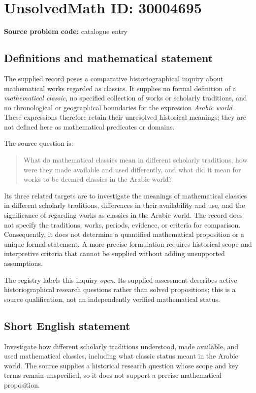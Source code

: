 \documentclass[11pt]{article}
\begin{document}
\section*{UnsolvedMath ID: 30004695}
\textbf{Source problem code:} catalogue entry
\subsection{Definitions and mathematical statement}
The supplied record poses a comparative historiographical inquiry about mathematical works regarded as classics. It supplies no formal definition of a \emph{mathematical classic}, no specified collection of works or scholarly traditions, and no chronological or geographical boundaries for the expression \emph{Arabic world}. These expressions therefore retain their unresolved historical meanings; they are not defined here as mathematical predicates or domains.

The source question is:
\begin{quote}
What do mathematical classics mean in different scholarly traditions, how were they made available and used differently, and what did it mean for works to be deemed classics in the Arabic world?
\end{quote}
Its three related targets are to investigate the meanings of mathematical classics in different scholarly traditions, differences in their availability and use, and the significance of regarding works as classics in the Arabic world. The record does not specify the traditions, works, periods, evidence, or criteria for comparison. Consequently, it does not determine a quantified mathematical proposition or a unique formal statement. A more precise formulation requires historical scope and interpretive criteria that cannot be supplied without adding unsupported assumptions.

The registry labels this inquiry \emph{open}. Its supplied assessment describes active historiographical research questions rather than solved propositions; this is a source qualification, not an independently verified mathematical status.
\subsection{Short English statement}
Investigate how different scholarly traditions understood, made available, and used mathematical classics, including what classic status meant in the Arabic world. The source supplies a historical research question whose scope and key terms remain unspecified, so it does not support a precise mathematical proposition.
\end{document}
